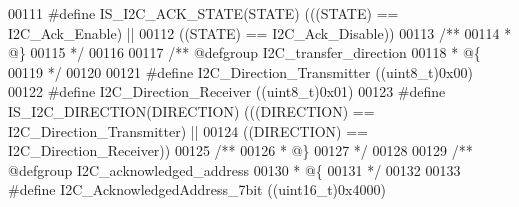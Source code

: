 \begin{DoxyCode}
00111 \textcolor{preprocessor}{#}\textcolor{preprocessor}{define} \textcolor{preprocessor}{IS\_I2C\_ACK\_STATE}\textcolor{preprocessor}{(}\textcolor{preprocessor}{STATE}\textcolor{preprocessor}{)} \textcolor{preprocessor}{(}\textcolor{preprocessor}{(}\textcolor{preprocessor}{(}\textcolor{preprocessor}{STATE}\textcolor{preprocessor}{)} \textcolor{preprocessor}{==} I2C_Ack_Enable\textcolor{preprocessor}{)} \textcolor{preprocessor}{||}
00112                                  \textcolor{preprocessor}{(}\textcolor{preprocessor}{(}\textcolor{preprocessor}{STATE}\textcolor{preprocessor}{)} \textcolor{preprocessor}{==} I2C_Ack_Disable\textcolor{preprocessor}{)}\textcolor{preprocessor}{)}
00113 \textcolor{comment}{/**}
00114 \textcolor{comment}{  * @\}}
00115 \textcolor{comment}{  */}
00116 
00117 \textcolor{comment}{/** @defgroup I2C\_transfer\_direction }
00118 \textcolor{comment}{  * @\{}
00119 \textcolor{comment}{  */}
00120 
00121 \textcolor{preprocessor}{#}\textcolor{preprocessor}{define}  \textcolor{preprocessor}{I2C\_Direction\_Transmitter}      \textcolor{preprocessor}{(}\textcolor{preprocessor}{(}\textcolor{preprocessor}{uint8\_t}\textcolor{preprocessor}{)}0x00\textcolor{preprocessor}{)}
00122 \textcolor{preprocessor}{#}\textcolor{preprocessor}{define}  \textcolor{preprocessor}{I2C\_Direction\_Receiver}         \textcolor{preprocessor}{(}\textcolor{preprocessor}{(}\textcolor{preprocessor}{uint8\_t}\textcolor{preprocessor}{)}0x01\textcolor{preprocessor}{)}
00123 \textcolor{preprocessor}{#}\textcolor{preprocessor}{define} \textcolor{preprocessor}{IS\_I2C\_DIRECTION}\textcolor{preprocessor}{(}\textcolor{preprocessor}{DIRECTION}\textcolor{preprocessor}{)} \textcolor{preprocessor}{(}\textcolor{preprocessor}{(}\textcolor{preprocessor}{(}\textcolor{preprocessor}{DIRECTION}\textcolor{preprocessor}{)} \textcolor{preprocessor}{==} 
      I2C_Direction_Transmitter\textcolor{preprocessor}{)} \textcolor{preprocessor}{||}
00124                                      \textcolor{preprocessor}{(}\textcolor{preprocessor}{(}\textcolor{preprocessor}{DIRECTION}\textcolor{preprocessor}{)} \textcolor{preprocessor}{==} I2C_Direction_Receiver\textcolor{preprocessor}{)}\textcolor{preprocessor}{)}
00125 \textcolor{comment}{/**}
00126 \textcolor{comment}{  * @\}}
00127 \textcolor{comment}{  */}
00128 
00129 \textcolor{comment}{/** @defgroup I2C\_acknowledged\_address }
00130 \textcolor{comment}{  * @\{}
00131 \textcolor{comment}{  */}
00132 
00133 \textcolor{preprocessor}{#}\textcolor{preprocessor}{define} \textcolor{preprocessor}{I2C\_AcknowledgedAddress\_7bit}    \textcolor{preprocessor}{(}\textcolor{preprocessor}{(}\textcolor{preprocessor}{uint16\_t}\textcolor{preprocessor}{)}0x4000\textcolor{preprocessor}{)}

\end{DoxyCode}
